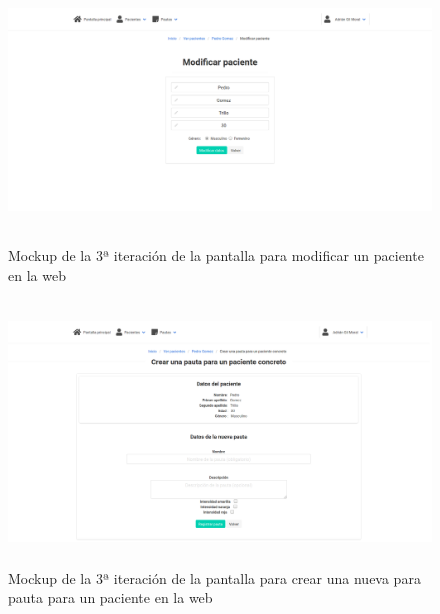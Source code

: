 \begin{figure}[H]
    \centering
    \includegraphics[height=7cm, width=\textwidth]{Imagenes/04DescProblema/mockups/v3/web/06-verPaciente-modificar.png}
    \caption[Mockup de la 3ª iteración de la pantalla para modificar un paciente en la web]{Mockup de la 3ª iteración de la pantalla para modificar un paciente en la web}
    \label{c4:fig:v3:web:modificarPaciente}
\end{figure}

\begin{figure}[H]
    \centering
    \includegraphics[height=7cm, width=\textwidth]{Imagenes/04DescProblema/mockups/v3/web/06-verPaciente-nuevaPauta.png}
    \caption[Mockup de la 3ª iteración de la pantalla para crear una nueva para pauta para un paciente en la web]{Mockup de la 3ª iteración de la pantalla para crear una nueva para pauta para un paciente en la web}
    \label{c4:fig:v3:web:nuevaPautaPaciente}
\end{figure}

